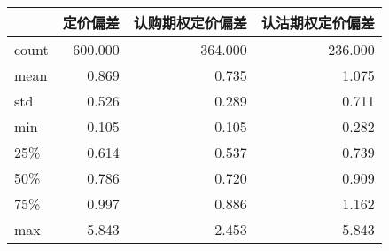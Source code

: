 \begin{tabular}{lrrr}
\toprule
{} &    定价偏差 &  认购期权定价偏差 &  认沽期权定价偏差 \\
\midrule
count & 600.000 &   364.000 &   236.000 \\
mean  &   0.869 &     0.735 &     1.075 \\
std   &   0.526 &     0.289 &     0.711 \\
min   &   0.105 &     0.105 &     0.282 \\
25\%   &   0.614 &     0.537 &     0.739 \\
50\%   &   0.786 &     0.720 &     0.909 \\
75\%   &   0.997 &     0.886 &     1.162 \\
max   &   5.843 &     2.453 &     5.843 \\
\bottomrule
\end{tabular}
